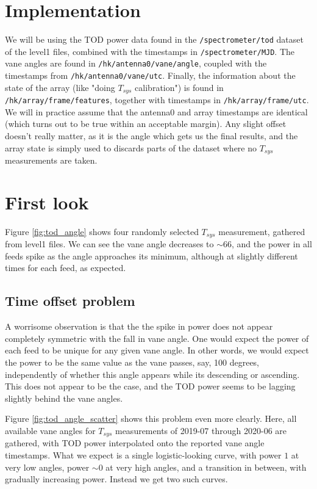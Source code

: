 \documentclass[10pt, a4paper]{article}
\begin{document}
\section{Implementation}
We will be using the TOD power data found in the \texttt{/spectrometer/tod} dataset of the level1 files, combined with the timestamps in \texttt{/spectrometer/MJD}. The vane angles are found in \texttt{/hk/antenna0/vane/angle}, coupled with the timestamps from \texttt{/hk/antenna0/vane/utc}. Finally, the information about the state of the array (like "doing $T_{sys}$ calibration") is found in \texttt{/hk/array/frame/features}, together with timestamps in \texttt{/hk/array/frame/utc}. We will in practice assume that the antenna0 and array timestamps are identical (which turns out to be true within an acceptable margin). Any slight offset doesn't really matter, as it is the angle which gets us the final results, and the array state is simply used to discards parts of the dataset where no $T_{sys}$ measurements are taken.


\section{First look}
Figure \ref{fig:tod_angle} shows four randomly selected $T_{sys}$ measurement, gathered from level1 files. We can see the vane angle decreases to $\sim 66$, and the power in all feeds spike as the angle approaches its minimum, although at slightly different times for each feed, as expected.

\subsection{Time offset problem}
A worrisome observation is that the the spike in power does not appear completely symmetric with the fall in vane angle. One would expect the power of each feed to be unique for any given vane angle. In other words, we would expect the power to be the same value as the vane passes, say, 100 degrees, independently of whether this angle appears while its descending or ascending. This does not appear to be the case, and the TOD power seems to be lagging slightly behind the vane angles.

Figure \ref{fig:tod_angle_scatter} shows this problem even more clearly. Here, all available vane angles for $T_{sys}$ measurements of 2019-07 through 2020-06 are gathered, with TOD power interpolated onto the reported vane angle timestamps. What we expect is a single logistic-looking curve, with power $1$ at very low angles, power $\sim 0$ at very high angles, and a transition in between, with gradually increasing power. Instead we get two such curves. 
\end{document}
